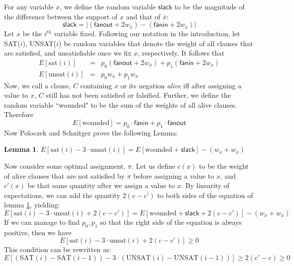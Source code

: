 \documentclass[11pt,letter]{article}
\newtheorem{lemma}[theorem]{Lemma}
\numberwithin{theorem}{section}
\begin{document}
For any variable $x$, we define the random variable $\mathsf{slack}$ to be the magnitude of the difference between the support of $x$ and that of $\bar{x}$:
\begin{equation}
\mathsf{slack} = |(\mathsf{fanout} + 2w_{\bar{x}}) -(\mathsf{fanin} + 2w_x)|
\end{equation}
Let $x$ be the $i^{th}$ variable fixed. Following our notation in the introduction, let SAT($i$), UNSAT($i$) be random variables that denote the weight of all clauses that are satisfied, and unsatisfiable once we fix $x$, respectively. It follows that
\begin{eqnarray}
E[\textrm{sat}(i)] &=& p_0(\mathsf{fanout} + 2w_{\bar{x}}) + p_1(\mathsf{fanin} + 2w_{x})\\
E[\textrm{unsat}(i)] &=& p_0w_x + p_1w_{\bar{x}}
\end{eqnarray}
Now, we call a clause, $C$ containing $x$ or its negation \textit{alive} iff after assigning a value to $x$, $C$ still has not been satisfied or falsified. Further, we define the random variable ``wounded" to be the sum of the weights of all alive clauses. Therefore
\begin{equation}
E[\textrm{wounded}] = p_0 \cdot \mathsf{fanin} + p_1 \cdot \mathsf{fanout}
\end{equation}
Now Poloczek and Schnitger prove the following Lemma:
\begin{lemma} \label{L:2}
$E[\textrm{sat}(i) - 3\cdot\textrm{unsat}(i)] = E[\textrm{wounded} + \mathsf{slack}] - (w_x + w_{\bar{x}})$
\end{lemma}
Now consider some optimal assignment, $\pi$. Let us define $c(x)$ to be the weight of alive clauses that are not satisfied by $\pi$ before assigning a value to $x$, and $c'(x)$ be that same quantity after we assign a value to $x$. By linearity of expectations, we can add the quantity $2(c-c')$ to both sides of the equation of lemma \ref{L:2}, yielding:
\begin{equation}
E[\textrm{sat}(i) - 3\cdot\textrm{unsat}(i)+ 2(c-c')] = E[\textrm{wounded} + \mathsf{slack} + 2(c-c')] - (w_x + w_{\bar{x}})
\end{equation}
If we can manage to find $p_0,p_1$ so that the right side of the equation is always positive, then we have
\begin{equation}
E[\textrm{sat}(i) - 3\cdot\textrm{unsat}(i)+ 2(c-c')] \ge 0 \label{C:1}
\end{equation}
This condition can be rewritten as:
\begin{equation}
E[(\textrm{SAT}(i) - \textrm{SAT}(i-1)) - 3\cdot(\textrm{UNSAT}(i) - \textrm{UNSAT}(i-1))] \ge  2(c'-c) \ge 0
\end{equation}
\end{document}

